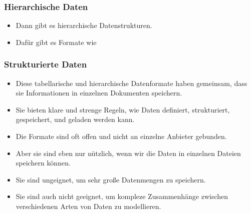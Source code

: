 \documentclass[aspectratio=169,mathserif,notheorems]{beamer}%
\begin{document}
%
%
\begin{frame}[t]%
\frametitle{Hierarchische Daten}%
\begin{itemize}%
\item Dann gibt es hierarchische Datenstrukturen.%
\item<2-> Dafür gibt es Formate wie ~\cite{BPSMM2008EMLX1FE,K2019ITXJY,CH2013XFCAMLTMC}%
\end{itemize}%
%
%
%
%
%
%
%
%
%
\end{frame}%
%
%
\begin{frame}[t]%
\frametitle{Strukturierte Daten}%
\begin{itemize}%
\item Diese tabellarische und hierarchische Datenformate haben gemeinsam, dass sie Informationen in einzelnen Dokumenten speichern.%
\item<2-> Sie bieten klare und strenge Regeln, wie Daten definiert, strukturiert, gespeichert, und geladen werden kann.%
\item<3-> Die Formate sind oft offen und nicht an einzelne Anbieter gebunden.%
\item<4-> Aber sie sind eben nur nützlich, wenn wir die Daten in einzelnen Dateien speichern können.%
\item<5-> Sie sind ungeignet, um sehr große Datenmengen zu speichern.%
\item<6-> Sie sind auch nicht geeignet, um kompleze Zusammenhänge zwischen verschiedenen Arten von Daten zu modellieren.%
\end{itemize}%
\end{frame}%
%
%
\end{document}
